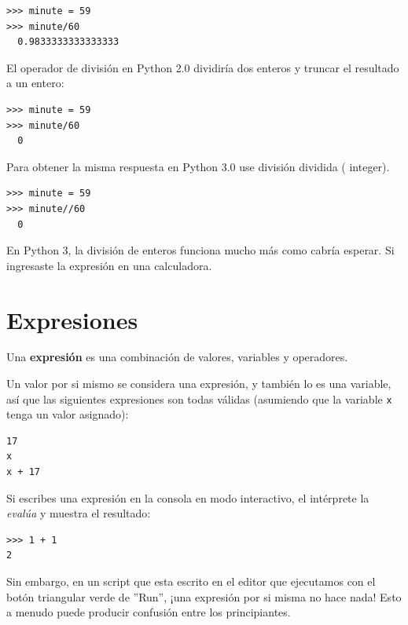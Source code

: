 \begin{Verbatim}[frame=single]
>>> minute = 59
>>> minute/60
  0.9833333333333333
\end{Verbatim}

El operador de división en Python 2.0 dividiría dos enteros y truncar el
resultado a un entero:

\begin{Verbatim}[frame=single]
>>> minute = 59
>>> minute/60
  0
\end{Verbatim}

Para obtener la misma respuesta en Python 3.0 use división dividida
(\pythoninline{//} integer).

\begin{Verbatim}[frame=single]
>>> minute = 59
>>> minute//60
  0
\end{Verbatim}

En Python 3, la división de enteros funciona mucho más como cabría
esperar. Si ingresaste la expresión en una calculadora.

  
 

\hypertarget{expresiones}{%
\section{Expresiones}\label{expresiones}}

\begin{definition}
Una \textbf{expresión} es una combinación de valores, variables y
operadores. 
\end{definition}

Un valor por si mismo se considera una expresión, y también
lo es una variable, así que las siguientes expresiones son todas válidas
(asumiendo que la variable \texttt{x} tenga un valor asignado):

 

\begin{Verbatim}[frame=single]
17
x
x + 17
\end{Verbatim}

Si escribes una expresión en la consola en modo interactivo, el intérprete la
\emph{evalúa} y muestra el resultado:

\begin{Verbatim}[frame=single]
>>> 1 + 1
2
\end{Verbatim}

Sin embargo, en un script que esta escrito en el editor que ejecutamos con el botón triangular verde de ''Run'', ¡una expresión por si misma no hace nada!
Esto a menudo puede producir confusión entre los principiantes.

